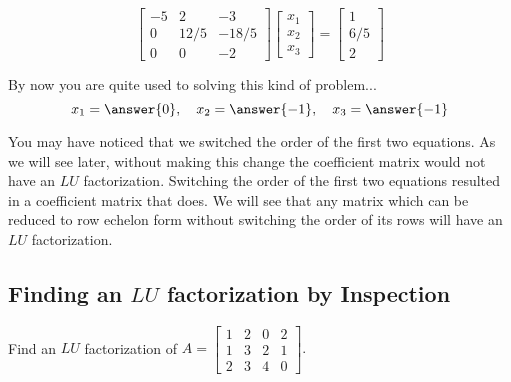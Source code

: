 \documentclass{ximera}
\begin{document}
\begin{example}
\begin{expandable}
$$\begin{bmatrix}
-5 & 2 & -3 \\
0 & 12/5  & -18/5 \\
0 & 0 & -2
\end{bmatrix} 
\begin{bmatrix} x_1 \\ x_2 \\ x_3 \end{bmatrix}
=
\begin{bmatrix} 1 \\ 6/5 \\ 2 \end{bmatrix}$$
\end{expandable}

By now you are quite used to solving this kind of problem...
$$x_1=\answer{0},\quad x_2=\answer{-1},\quad x_3=\answer{-1}$$
\end{example}

You may have noticed that we switched the order of the first two equations.  As we will see later, without making this change the coefficient matrix would not have an $LU$ factorization. Switching the order of the first two equations resulted in a coefficient matrix that does.  We will see that any matrix which can be reduced to row echelon form without switching the order of its rows will have an $LU$ factorization.

\subsection*{Finding an $LU$ factorization by Inspection}

\begin{example}\label{ex:LU1}
Find an $LU$ factorization of $A=
\begin{bmatrix}
1 & 2 & 0 & 2 \\
1 & 3 & 2 & 1 \\
2 & 3 & 4 & 0
\end{bmatrix}
.$
\end{example}
\end{document}
